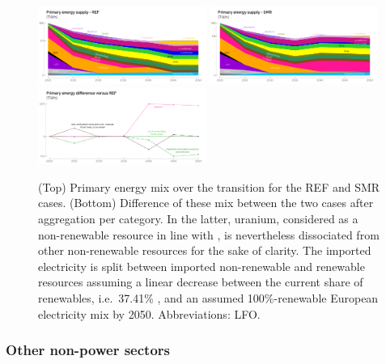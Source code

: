 \documentclass[11pt,twoside,a4paper,english]{article}
\def\ie{i.e.\ }
\begin{document}
\begin{figure}[!htbp]
\centering
\includegraphics[width=0.49\textwidth]{figures/Primary_mix_REF.pdf}
\includegraphics[width=0.49\textwidth]{figures/Primary_mix_SMR.pdf}
\includegraphics[width=0.49\textwidth]{figures/Primary_mix_diff_uranium.pdf}
\caption{(Top) Primary energy mix over the transition for the REF and SMR cases. (Bottom) Difference of these mix between the two cases after aggregation per category. In the latter, uranium, considered as a non-renewable resource in line with \citet{rixhon2021terminology}, is nevertheless dissociated from other non-renewable resources for the sake of clarity. The imported electricity is split between imported non-renewable and renewable resources assuming a linear decrease between the current share of renewables, \ie 37.41\% \cite{eurostat_share_re_elec}, and an assumed 100\%-renewable European electricity mix by 2050. Abbreviations: \acrfull{LFO}.}
\label{fig:results_deter_energy_mix}
\end{figure}

\subsubsection{Other non-power sectors}
\label{subsubsec:results_deter_others}
\end{document}
